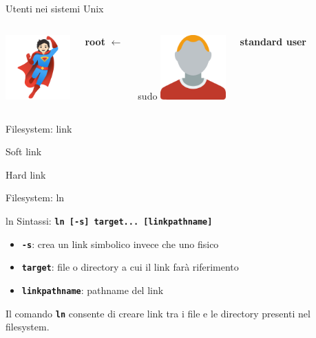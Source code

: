 \documentclass{beamer}
\begin{document}
    \begin{frame}{Utenti nei sistemi Unix}
        \begin{columns}[t, onlytextwidth]
                \centering
                \includegraphics[height=2.5cm, keepaspectratio]{images/root.pdf}

                \large \textbf{root}
                \centering
                \Huge $\longleftarrow$

                \large sudo
                \centering
                \includegraphics[height=2.5cm, keepaspectratio]{images/user2.pdf}

                \large \textbf{standard user}
        \end{columns}
    \end{frame}

    \begin{frame}{Filesystem: link}
        \begin{block}{Soft link}

        \end{block}

        \begin{block}{Hard link}
        \end{block}
    \end{frame}

    \begin{frame}{Filesystem: ln}
        \begin{block}{ln}
            Sintassi: \texttt{\textbf{ln [-s] target... [linkpathname]}}

            \begin{itemize}
                \item \texttt{\textbf{-s}}: crea un link simbolico invece che uno fisico
                \item \texttt{\textbf{target}}: file o directory a cui il link farà riferimento
                \item \texttt{\textbf{linkpathname}}: pathname del link
            \end{itemize}

            Il comando \texttt{\textbf{ln}} consente di creare link tra i file e le directory presenti nel filesystem.
        \end{block}
    \end{frame}
\end{document}
